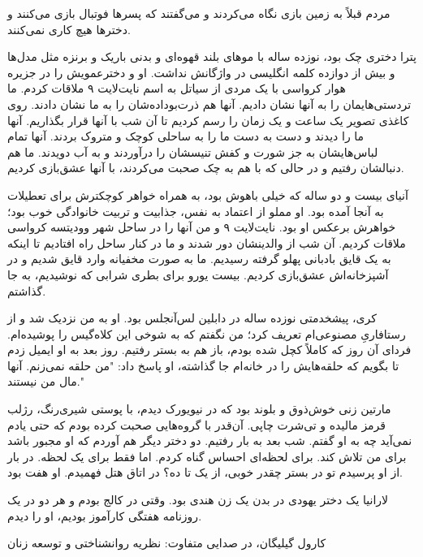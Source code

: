 مردم قبلاً به زمین بازی نگاه می‌کردند و می‌گفتند که پسرها فوتبال بازی می‌کنند و دخترها هیچ کاری نمی‌کنند.

پترا دختری چک بود، نوزده ساله با موهای بلند قهوه‌ای و بدنی باریک و برنزه مثل مدل‌ها و بیش از دوازده کلمه انگلیسی در واژگانش نداشت. او و دخترعمویش را در جزیره هوار کرواسی با یک مردی از سیاتل به اسم نایت‌لایت ۹ ملاقات کردم. ما تردستی‌هایمان را به آنها نشان دادیم. آنها هم ذرت‌بوداده‌شان را به ما نشان دادند. روی کاغذی تصویر یک ساعت و یک زمان را رسم کردیم تا آن شب با آنها قرار بگذاریم. آنها ما را دیدند و دست به دست ما را به ساحلی کوچک و متروک بردند. آنها تمام لباس‌هایشان به جز شورت و کفش تنیسشان را درآوردند و به آب دویدند. ما هم دنبالشان رفتیم و در حالی که با هم به چک صحبت می‌کردند، با آنها عشق‌بازی کردیم.

آنیای بیست و دو ساله که خیلی باهوش بود، به همراه خواهر کوچکترش برای تعطیلات به آنجا آمده بود. او مملو از اعتماد به نفس، جذابیت و تربیت خانوادگی خوب بود؛ خواهرش برعکس او بود. نایت‌لایت ۹ و من آنها را در ساحل شهر وودیتسه کرواسی ملاقات کردیم. آن شب از والدینشان دور شدند و ما در کنار ساحل راه افتادیم تا اینکه به یک قایق بادبانی پهلو گرفته رسیدیم. ما به صورت مخفیانه وارد قایق شدیم و در آشپزخانه‌اش عشق‌بازی کردیم. بیست یورو برای بطری شرابی که نوشیدیم، به جا گذاشتم.

کری، پیشخدمتی نوزده ساله در دابلین لس‌آنجلس بود. او به من نزدیک شد و از رستافاریِ مصنوعی‌ام تعریف کرد؛ من نگفتم که به شوخی این کلاه‌گیس را پوشیده‌ام. فردای آن روز که کاملاً کچل شده بودم، باز هم به بستر رفتیم. روز بعد به او ایمیل زدم تا بگویم که حلقه‌هایش را در خانه‌ام جا گذاشته، او پاسخ داد: "من حلقه نمی‌زنم. آنها مال من نیستند."

مارتین زنی خوش‌ذوق و بلوند بود که در نیویورک دیدم، با پوستی شیری‌رنگ، رژلب قرمز مالیده و تی‌شرت چاپی. آن‌قدر با گروه‌هایی صحبت کرده بودم که حتی یادم نمی‌آید چه به او گفتم. شب بعد به بار رفتیم. دو دختر دیگر هم آوردم که او مجبور باشد برای من تلاش کند. برای لحظه‌ای احساس گناه کردم. اما فقط برای یک لحظه. در بار از او پرسیدم تو در بستر چقدر خوبی، از یک تا ده؟ در اتاق هتل فهمیدم. او هفت بود.

لارانیا یک دختر یهودی در بدن یک زن هندی بود. وقتی در کالج بودم و هر دو در یک روزنامه هفتگی کارآموز بودیم، او را دیدم.

کارول گیلیگان،
در صدایی متفاوت: نظریه روانشناختی و توسعه زنان